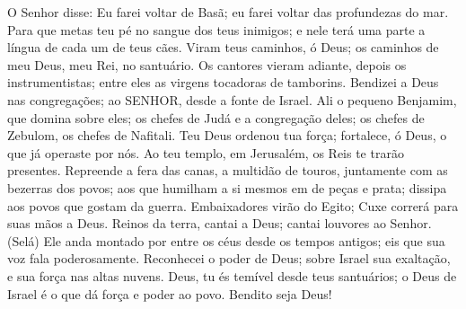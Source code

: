 {O Senhor disse: Eu
{} farei voltar de Basã; eu
{} farei voltar das profundezas do mar.
Para que metas teu pé no sangue dos teus inimigos; e nele
{} terá uma parte a língua de cada um de teus cães.
Viram teus caminhos, ó Deus; os caminhos de meu Deus, meu Rei, no santuário.
Os cantores vieram adiante, depois os instrumentistas; entre eles as virgens tocadoras de tamborins.
Bendizei a Deus nas congregações;
{} ao SENHOR, desde a fonte de Israel.
Ali
{} o pequeno Benjamim, que domina sobre eles; os chefes de Judá e a congregação deles; os chefes de Zebulom,
{} os chefes de Nafitali.
Teu Deus ordenou tua força; fortalece, ó Deus, o que já operaste por nós.
Ao teu templo, em Jerusalém, os Reis te trarão presentes.
Repreende a fera das canas, a multidão de touros, juntamente com as bezerras dos povos; aos que humilham a si mesmos em
{} de peças e prata; dissipa aos povos que gostam da guerra.
Embaixadores virão do Egito; Cuxe correrá para
{} suas mãos a Deus.
Reinos da terra, cantai a Deus; cantai louvores ao Senhor. (Selá)
Ele anda montado por entre os céus desde os tempos antigos; eis que sua voz fala poderosamente.
Reconhecei o poder de Deus; sobre Israel
{} sua exaltação, e sua força
{} nas altas nuvens.
Deus, tu és temível desde teus santuários; o Deus de Israel é o que dá força e poder ao povo. Bendito seja Deus!

}
